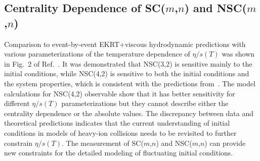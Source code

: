 \subsection{Centrality Dependence of SC($m$,$n$) and NSC($m$,$n$)}
\label{sec:theory_allorder}
Comparison to event-by-event EKRT+viscous hydrodynamic predictions with various parameterizations of the temperature dependence of $\eta/s(T)$ was shown in Fig.~2 of Ref.~\cite{ALICE:2016kpq}.
It was demonstrated that NSC(3,2) is sensitive mainly to the initial conditions, while NSC(4,2) is sensitive to both the initial conditions and the system properties, which is consistent with the predictions from~\cite{Niemi:2012aj}.
The model calculations for NSC(4,2) observable show that it has better sensitivity for different $\eta/s(T)$ parameterizations but they cannot
describe either the centrality dependence or the absolute values. The discrepancy between data and theoretical predictions indicates that the current understanding of initial conditions in models of heavy-ion collisions needs to be revisited to further constrain $\eta/s(T)$.
The measurement of SC($m$,$n$) and NSC($m$,$n$) can provide new constraints for the detailed modeling of fluctuating initial conditions.

